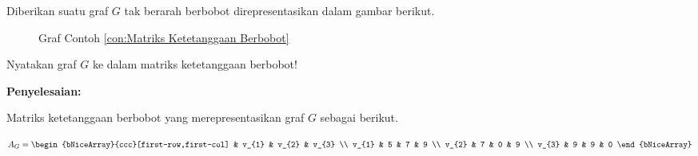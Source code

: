 {{{            \begin{contoh}
                \label{con:Matriks Ketetanggaan Berbobot}
                Diberikan suatu graf $G$ tak berarah berbobot direpresentasikan dalam gambar berikut.

                \begin{figure}
                    \centering
                    \vspace{0mm}
                    \caption{Graf Contoh \ref{con:Matriks Ketetanggaan Berbobot}}
                    \label{gam:Contoh Matriks ketetanggaan Berbobot}
                \end{figure}

                \noindent
                Nyatakan graf $G$ ke dalam matriks ketetanggaan berbobot!

                \noindent
                \textbf{Penyelesaian:}

                {\noindent
                    Matriks ketetanggaan berbobot yang merepresentasikan graf $G$ sebagai berikut.

                    \begin{equation*}
                        A_{G} =
                        \begin{bNiceArray}{ccc}[first-row,first-col]
                            & v_{1} & v_{2} & v_{3} \\
                            v_{1} & 5 & 7 & 9 \\
                            v_{2} & 7 & 0 & 9 \\
                            v_{3} & 9 & 9 & 0
                        \end{bNiceArray}
                    \end{equation*}

}
\end{contoh}}}}
